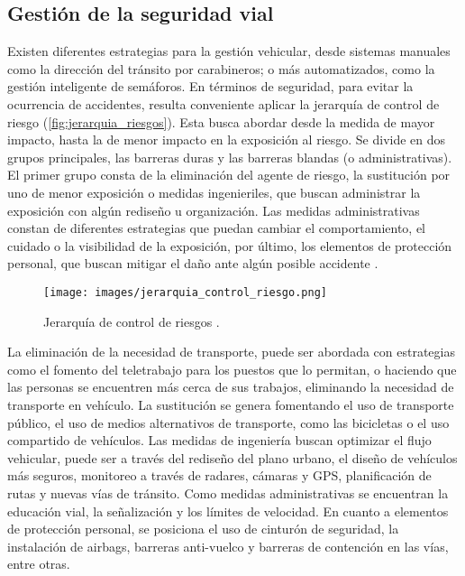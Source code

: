 \documentclass[12pt]{article}
\begin{document}
\subsection{Gestión de la seguridad vial}

Existen diferentes estrategias para la gestión vehicular, desde sistemas manuales como la dirección del tránsito por carabineros; o más automatizados, como la gestión inteligente de semáforos. En términos de seguridad, para evitar la ocurrencia de accidentes, resulta conveniente aplicar la jerarquía de control de riesgo (\autoref{fig:jerarquia_riesgos}). Esta busca abordar desde la medida de mayor impacto, hasta la de menor impacto en la exposición al riesgo. Se divide en dos grupos principales, las barreras duras y las barreras blandas (o administrativas). El primer grupo consta de la eliminación del agente de riesgo, la sustitución por uno de menor exposición o medidas ingenieriles, que buscan administrar la exposición con algún rediseño u organización. Las medidas administrativas constan de diferentes estrategias que puedan cambiar el comportamiento, el cuidado o la visibilidad de la exposición, por último, los elementos de protección personal, que buscan mitigar el daño ante algún posible accidente \parencite{niosh2024}.

\begin{figure}[h]
    \centering
    \texttt{[image: images/jerarquia\_control\_riesgo.png]}
    \caption{Jerarquía de control de riesgos \parencite{niosh2024}.}
    \label{fig:jerarquia_riesgos}
\end{figure}

La eliminación de la necesidad de transporte, puede ser abordada con estrategias como el fomento del teletrabajo para los puestos que lo permitan, o haciendo que las personas se encuentren más cerca de sus trabajos, eliminando la necesidad de transporte en vehículo. La sustitución se genera fomentando el uso de transporte público, el uso de medios alternativos de transporte, como las bicicletas o el uso compartido de vehículos. Las medidas de ingeniería buscan optimizar el flujo vehicular, puede ser a través del rediseño del plano urbano, el diseño de vehículos más seguros, monitoreo a través de radares, cámaras y GPS, planificación de rutas y nuevas vías de tránsito. Como medidas administrativas se encuentran la educación vial, la señalización y los límites de velocidad. En cuanto a elementos de protección personal, se posiciona el uso de cinturón de seguridad, la instalación de airbags, barreras anti-vuelco y barreras de contención en las vías, entre otras.
\end{document}
